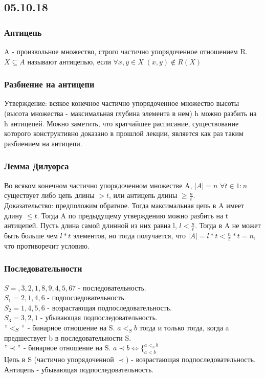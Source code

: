 \subsection{05.10.18}
\subsubsection{Антицепь}
A - произвольное множество, строго частично упорядоченное отношением R. $X \subseteq A$ называют антицепью, если $\forall x, y \in X \; (x, y) \not\in R(X)$
\subsubsection{Разбиение на антицепи}
Утверждение: всякое конечное частично упорядоченное множество высоты (высота множества - максимальная глубина элемента в нем) h можно разбить на h антицепей. Можно заметить, что кратчайшее расписание, существование которого конструктивно доказано в прошлой лекции, является как раз таким разбиением на антицепи.
\subsubsection{Лемма Дилуорса}
Во всяком конечном частично упорядоченном множестве A, $|A| = n$ $\forall t \in 1:n$ существует либо цепь длины $> t$, или антицепь длины $\geq \frac{n}{t}$. \\
Доказательство: предположим обратное. Тогда максимальная цепь в A имеет длину $\leq t$. Тогда A по предыдущему утверждению можно разбить на t антицепей. Пусть длина самой длинной из них равна l, $l < \frac{n}{t}$. Тогда в A не может быть больше чем $l * t$ элементов, но тогда получается, что $|A| = l * t < \frac{n}{t} * t = n$, что противоречит условию.
\subsubsection{Последовательности}
$S = , 3, 2, 1, 8, 9, 4, 5, 67$ - последовательность.\\
$S_1 = 2, 1, 4, 6$ - подпоследовательность.\\
$S_2 = 1, 4, 5, 6$ - возрастающая подпоследовательность.\\
$S_3 = 3, 2, 1$ - убывающая подпоследовательность.\\
$"<_S"$ - бинарное отношение на S. $a <_S b$ тогда и только тогда, когда a предшествует b в последовательности S.\\
$"\prec"$ - бинарное отношение на S. $a \prec b \Leftrightarrow \{_{a < b}^{a <_S b}$\\
Цепь в S (частично упорядоченной $\prec$) - возрастающая подпоследовательность. Антицепь - убывающая подпоследовательность.
